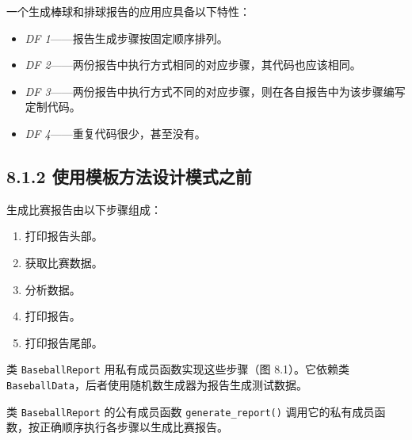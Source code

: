 一个生成棒球和排球报告的应用应具备以下特性：

\begin{itemize}
\item \emph{DF 1}——报告生成步骤按固定顺序排列。
\item \emph{DF 2}——两份报告中执行方式相同的对应步骤，其代码也应该相同。
\item \emph{DF 3}——两份报告中执行方式不同的对应步骤，则在各自报告中为该步骤编写定制代码。
\item \emph{DF 4}——重复代码很少，甚至没有。
\end{itemize}

\subsection{8.1.2 使用模板方法设计模式之前}

生成比赛报告由以下步骤组成：

\begin{enumerate}
\item 打印报告头部。
\item 获取比赛数据。
\item 分析数据。
\item 打印报告。
\item 打印报告尾部。
\end{enumerate}

类 \texttt{Baseball\allowbreak{}Report} 用私有成员函数实现这些步骤（图 8.1）。它依赖类 \texttt{Baseball\allowbreak{}Data}，后者使用随机数生成器为报告生成测试数据。


类 \texttt{Baseball\allowbreak{}Report} 的公有成员函数 \texttt{generate\_\allowbreak{}report(\allowbreak{})\allowbreak{}} 调用它的私有成员函数，按正确顺序执行各步骤以生成比赛报告。

